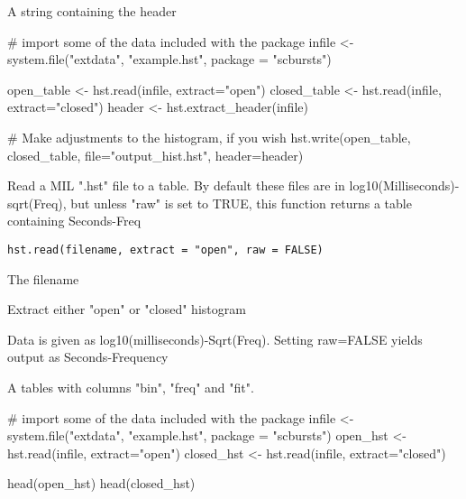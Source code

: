 \documentclass[letterpaper]{book}
\begin{document}
%
\begin{Value}
A string containing the header
\end{Value}
%
\begin{Examples}
\begin{ExampleCode}

# import some of the data included with the package
infile <- system.file("extdata", "example.hst", package = "scbursts")

open_table <- hst.read(infile, extract="open")
closed_table <- hst.read(infile, extract="closed")
header <- hst.extract_header(infile)

# Make adjustments to the histogram, if you wish
hst.write(open_table, closed_table, file="output_hist.hst", header=header)

\end{ExampleCode}
\end{Examples}
%
\begin{Description}\relax
Read a MIL ".hst" file to a table. By default these files are in log10(Milliseconds)-sqrt(Freq), but unless "raw" is set to TRUE, this function returns a table containing Seconds-Freq
\end{Description}
%
\begin{Usage}
\begin{verbatim}
hst.read(filename, extract = "open", raw = FALSE)
\end{verbatim}
\end{Usage}
%
\begin{Arguments}
\begin{ldescription}
\item[\code{filename}] The filename

\item[\code{extract}] Extract either "open" or "closed" histogram

\item[\code{raw}] Data is given as log10(milliseconds)-Sqrt(Freq). Setting raw=FALSE yields output as Seconds-Frequency
\end{ldescription}
\end{Arguments}
%
\begin{Value}
A tables with columns "bin", "freq" and "fit".
\end{Value}
%
\begin{Examples}
\begin{ExampleCode}

# import some of the data included with the package
infile <- system.file("extdata", "example.hst", package = "scbursts")
open_hst   <- hst.read(infile, extract="open")
closed_hst <- hst.read(infile, extract="closed")

head(open_hst)
head(closed_hst)

\end{ExampleCode}
\end{Examples}
\end{document}
